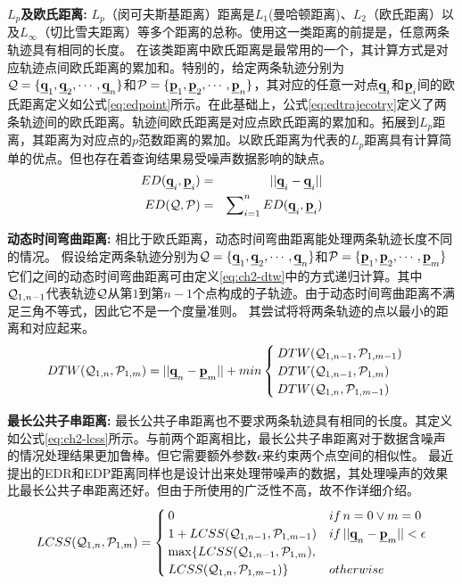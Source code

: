 \textbf{$L_{p}$及欧氏距离:}
$L_{p}$（闵可夫斯基距离）距离是$L_1$(曼哈顿距离)、$L_2$（欧氏距离）以及$L_\infty$（切比雪夫距离）等多个距离的总称。使用这一类距离的前提是，任意两条轨迹具有相同的长度。
在该类距离中欧氏距离是最常用的一个，其计算方式是对应轨迹点间欧氏距离的累加和。特别的，给定两条轨迹分别为${\cal{Q}}=\{\emph{{\textbf{q}}}_{1},\emph{{\textbf{q}}}_{2},\cdots,\emph{{\textbf{q}}}_{n}\}$和${\cal{P}}=\{\emph{{\textbf{p}}}_1,\emph{{\textbf{p}}}_{2},\cdots,\emph{{\textbf{p}}}_{n}\}$，其对应的任意一对点$\emph{{\textbf{q}}}_{i}$和$\emph{{\textbf{p}}}_{i}$间的欧氏距离定义如公式\ref{eq:edpoint}所示。在此基础上，公式\ref{eq:edtrajecotry}定义了两条轨迹间的欧氏距离。轨迹间欧氏距离是对应点欧氏距离的累加和。拓展到$L_{p}$距离，其距离为对应点的$p$范数距离的累加。以欧氏距离为代表的$L_{p}$距离具有计算简单的优点。但也存在着查询结果易受噪声数据影响的缺点。
\begin{eqnarray}
ED(\emph{{\textbf{q}}}_{i},\emph{{\textbf{p}}}_{i})&=&||\emph{{\textbf{q}}}_{i} - \emph{{\textbf{q}}}_{i}|| \\ \label{eq:edpoint}
ED({\cal{Q}}, {\cal{P}})&=&\sum\nolimits_{i=1}^{n}ED(\emph{{\textbf{q}}}_{i},\emph{{\textbf{p}}}_{i}) \label{eq:edtrajecotry}
\end{eqnarray}


\textbf{动态时间弯曲距离:}
相比于欧氏距离，动态时间弯曲距离能处理两条轨迹长度不同的情况。
假设给定两条轨迹分别为${\cal{Q}}=\{\emph{{\textbf{q}}}_{1},\emph{{\textbf{q}}}_{2},\cdots,\emph{{\textbf{q}}}_{n}\}$和${\cal{P}}=\{\emph{{\textbf{p}}}_1,\emph{{\textbf{p}}}_{2},\cdots,\emph{{\textbf{p}}}_{m}\}$
它们之间的动态时间弯曲距离可由定义\ref{eq:ch2-dtw}中的方式递归计算。其中${\cal{Q}}_{1,n-1}$代表轨迹$\cal Q$从第$1$到第$n-1$个点构成的子轨迹。由于动态时间弯曲距离不满足三角不等式，因此它不是一个度量准则。
其尝试将将两条轨迹的点以最小的距离和对应起来。
\begin{equation}\label{eq:ch2-dtw}
DTW({\cal{Q}}_{1,n}, {\cal{P}}_{1,m})=||\emph{{\textbf{q}}}_{n}-\emph{{\textbf{p}}}_{m}||+min \begin{cases}
DTW({\cal{Q}}_{1,n-1}, {\cal{P}}_{1,m-1})  \\
DTW({\cal{Q}}_{1,n-1}, {\cal{P}}_{1,m})  \\
DTW({\cal{Q}}_{1,n}, {\cal{P}}_{1,m-1})
\end{cases}
\end{equation}


\textbf{最长公共子串距离:}
最长公共子串距离也不要求两条轨迹具有相同的长度。其定义如公式\ref{eq:ch2-lcss}所示。与前两个距离相比，最长公共子串距离对于数据含噪声的情况处理结果更加鲁棒。但它需要额外参数$\epsilon$来约束两个点空间的相似性。
最近提出的EDR和EDP距离同样也是设计出来处理带噪声的数据，其处理噪声的效果比最长公共子串距离还好。但由于所使用的广泛性不高，故不作详细介绍。
\begin{eqnarray}\label{eq:ch2-lcss}
LCSS({\cal{Q}}_{1,n}, {\cal{P}}_{1,m})= \begin{cases}
0 & if \, n=0 \lor m=0  \\
1+ LCSS({\cal{Q}}_{1,n-1}, {\cal{P}}_{1,m-1}) & if \,  ||\emph{{\textbf{q}}}_{n}-\emph{{\textbf{p}}}_{m}||<\epsilon  \\
\max \{LCSS({\cal{Q}}_{1,n-1}, {\cal{P}}_{1,m}) ,\\LCSS({\cal{Q}}_{1,n}, {\cal{P}}_{1,m-1})\} & otherwise
\end{cases}
\end{eqnarray}



